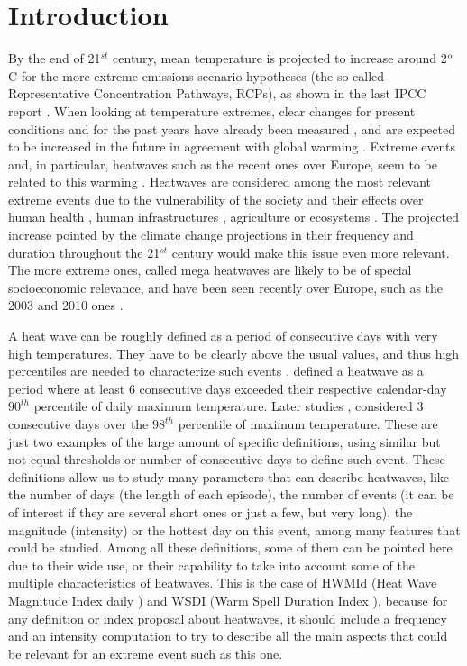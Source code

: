 \section{Introduction}

By the end of 21$^{st}$ century, mean 
temperature is projected to increase around 2$^{\rm{o}}$C for the more
extreme emissions scenario hypotheses (the so-called Representative
Concentration Pathways, RCPs), as shown in the last IPCC report \cite{sto2014}.
When looking at temperature extremes, clear changes for present
conditions and for the past years have already been measured \cite{don_al2013}, and 
are expected to be increased in the future in agreement with 
global warming \cite{sen_al2012,Car_al2018}. Extreme events
and, in particular, heatwaves such as the recent ones over Europe,
seem to be related to this warming \cite{ben_al2017}. Heatwaves are considered among
the most relevant extreme events due to the vulnerability of the society and their
effects over human health \cite{dun_al2013,ame_al2014,roh_al2018}, human
infrastructures
\cite{col_al1999,mce_al2012}, agriculture \cite{bar_al2011} or
ecosystems \cite{sto2014,hob_al2016}. The projected increase pointed  by the climate
change projections in their frequency 
and duration throughout the 21$^{st}$ century
\cite{fri_al2002,bal_al2010,sto2014,hor_al2016}
would make this issue even more relevant.
The more extreme ones, called mega heatwaves are likely to be
of special socioeconomic relevance, and have been seen recently 
over Europe, such as the 2003 and 2010 ones \cite{bar_al2011}. 

A heat wave can be roughly defined as a period of consecutive days with very high
temperatures. They have to be clearly above the usual values, and thus high
percentiles are needed
to characterize such events \cite{per2015}. \cite{fis_sch2010} defined a  heatwave as
a period where at least 6 consecutive days exceeded their respective calendar-day
$90^{th}$ percentile of daily maximum temperature. 
Later studies \cite{sch_al2015}, considered 3 consecutive days 
over the $98^{th}$ percentile of maximum temperature. These are just two examples of
the large amount of specific definitions, using similar but not equal thresholds or
number of consecutive days to define such event.
These definitions allow us to study many parameters that can describe heatwaves, like
the number of days (the length of each episode), the number  of events (it can be of
interest if they are several short ones or just a few, but very long), the magnitude
(intensity) or the hottest day on this event, among many features that could be
studied. Among all these definitions,
some of them can be pointed here due to their wide use, or their capability to take
into account some of the multiple characteristics of heatwaves. This is the case of
HWMId (Heat Wave Magnitude Index daily \cite{rus_al2015}) and
WSDI (Warm Spell Duration Index \cite{zha_al2011}), because for any definition or
index proposal about heatwaves, it should include a frequency and an intensity
computation to try to describe all the main aspects that
could be relevant for an extreme event such as this one.

